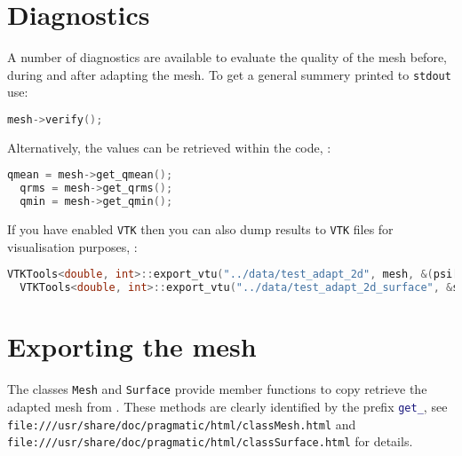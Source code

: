 \section{Diagnostics}
A number of diagnostics are available to evaluate the quality of the
mesh before, during and after adapting the mesh. To get a general
summery printed to \lstinline[language=bash]+stdout+ use:
\begin{lstlisting}[language=C++]
  mesh->verify();
\end{lstlisting}

Alternatively, the values can be retrieved within the code, \eg:
\begin{lstlisting}[language=C++]
  qmean = mesh->get_qmean();
  qrms = mesh->get_qrms();
  qmin = mesh->get_qmin();
\end{lstlisting}

If you have enabled \lstinline[language=bash]+VTK+ then you can also
dump results to \lstinline[language=bash]+VTK+ files for visualisation
purposes, \eg:
\begin{lstlisting}[language=C++]
  VTKTools<double, int>::export_vtu("../data/test_adapt_2d", mesh, &(psi[0]));
  VTKTools<double, int>::export_vtu("../data/test_adapt_2d_surface", &surface);
\end{lstlisting}

\section{Exporting the mesh}
The classes \lstinline[language=c++]+Mesh+ and
\lstinline[language=c++]+Surface+ provide member functions to copy
retrieve the adapted mesh from \pragmatic. These methods are clearly
identified by the prefix \lstinline[language=c++]+get_+, see
\lstinline[language=html]+file:///usr/share/doc/pragmatic/html/classMesh.html+
and
\lstinline[language=html]+file:///usr/share/doc/pragmatic/html/classSurface.html+
for details.

